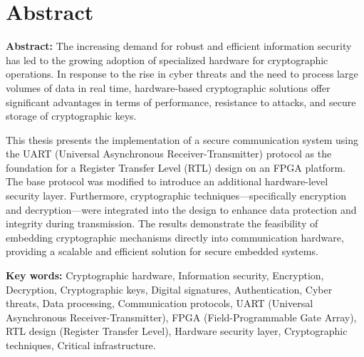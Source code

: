 \chapter{Abstract}

\textbf{Abstract:} 
The increasing demand for robust and efficient information security has led to the growing adoption of specialized hardware for cryptographic operations. In response to the rise in cyber threats and the need to process large volumes of data in real time, hardware-based cryptographic solutions offer significant advantages in terms of performance, resistance to attacks, and secure storage of cryptographic keys.

This thesis presents the implementation of a secure communication system using the UART (Universal Asynchronous Receiver-Transmitter) protocol as the foundation for a Register Transfer Level (RTL) design on an FPGA platform. The base protocol was modified to introduce an additional hardware-level security layer. Furthermore, cryptographic techniques—specifically encryption and decryption—were integrated into the design to enhance data protection and integrity during transmission. The results demonstrate the feasibility of embedding cryptographic mechanisms directly into communication hardware, providing a scalable and efficient solution for secure embedded systems.





\textbf{Key words:} Cryptographic hardware, Information security, Encryption, Decryption, Cryptographic keys, Digital signatures, Authentication, Cyber threats, Data processing, Communication protocols, UART (Universal Asynchronous Receiver-Transmitter), FPGA (Field-Programmable Gate Array), RTL design (Register Transfer Level), Hardware security layer, Cryptographic techniques, Critical infrastructure.\\


\endinput 